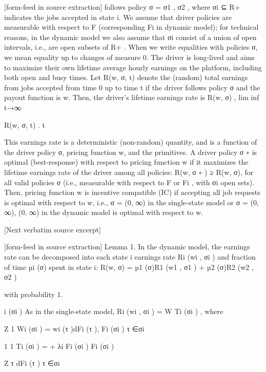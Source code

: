 \documentclass[10pt]{article}
\begin{document}
\begin{ReviewVerbatim}


[form-feed in source extraction]
follows policy σ = {σ1 , σ2 }, where σi ⊆ R+ indicates the jobs accepted in state i. We assume that
driver policies are measurable with respect to F (corresponding Fi in dynamic model); for technical
reasons, in the dynamic model we also assume that σi consist of a union of open intervals, i.e., are
open subsets of R+ . When we write equalities with policies σ, we mean equality up to changes of
measure 0.
The driver is long-lived and aims to maximize their own lifetime average hourly earnings on the
platform, including both open and busy times. Let R(w, σ, t) denote the (random) total earnings
from jobs accepted from time 0 up to time t if the driver follows policy σ and the payout function
is w. Then, the driver’s lifetime earnings rate is
R(w, σ) , lim inf t→∞

R(w, σ, t)
.
t

This earnings rate is a deterministic (non-random) quantity, and is a function of the driver policy
σ, pricing function w, and the primitives.
A driver policy σ ∗ is optimal (best-response) with respect to pricing function w if it maximizes
the lifetime earnings rate of the driver among all policies: R(w, σ ∗ ) ≥ R(w, σ), for all valid policies
σ (i.e., measurable with respect to F or Fi , with σi open sets). Then, pricing function w is incentive
compatible (IC) if accepting all job requests is optimal with respect to w, i.e., σ = (0, ∞) in
the single-state model or σ = {(0, ∞), (0, ∞)} in the dynamic model is optimal with respect to w.

[Next verbatim source excerpt]


[form-feed in source extraction]
Lemma 1. In the dynamic model, the earnings rate can be decomposed into each state i earnings
rate Ri (wi , σi ) and fraction of time µi (σ) spent in state i:
R(w, σ) = µ1 (σ)R1 (w1 , σ1 ) + µ2 (σ)R2 (w2 , σ2 )

with probability 1.

i (σi )
As in the single-state model, Ri (wi , σi ) = W
Ti (σi ) , where

Z
1
Wi (σi ) =
wi (τ )dFi (τ ),
Fi (σi ) τ ∈σi

1
1
Ti (σi ) =
+
λi Fi (σi ) Fi (σi )

Z
τ dFi (τ )
τ ∈σi


\end{ReviewVerbatim}
\end{document}
